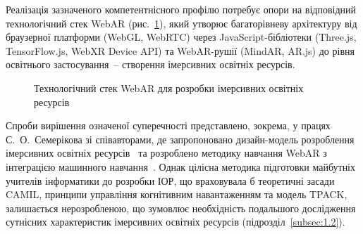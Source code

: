 Реалізація зазначеного компетентнісного профілю потребує опори на відповідний технологічний стек WebAR (рис.~\ref{fig:webar_stack}), який утворює багаторівневу архітектуру від браузерної платформи (WebGL, WebRTC) через JavaScript-бібліотеки (Three.js, TensorFlow.js, WebXR Device API) та WebAR-рушії (MindAR, AR.js) до рівня освітнього застосування~-- створення імерсивних освітніх ресурсів.

\begin{figure}[!h]
\centering

\caption{Технологічний стек WebAR для розробки імерсивних освітніх ресурсів}
\label{fig:webar_stack}
\end{figure}

Спроби вирішення означеної суперечності представлено, зокрема, у працях С.~О.~Семерікова зі співавторами, де запропоновано дизайн-модель розроблення імерсивних освітніх ресурсів~\cite{Semerikov2022IERDesign} та розроблено методику навчання WebAR з інтеграцією машинного навчання~\cite{Semerikov2024WebAR_EduDim}. Однак цілісна методика підготовки майбутніх учителів інформатики до розробки ІОР, що враховувала б теоретичні засади CAMIL, принципи управління когнітивним навантаженням та модель TPACK, залишається нерозробленою, що зумовлює необхідність подальшого дослідження сутнісних характеристик імерсивних освітніх ресурсів (підрозділ~\ref{subsec:1.2}).
